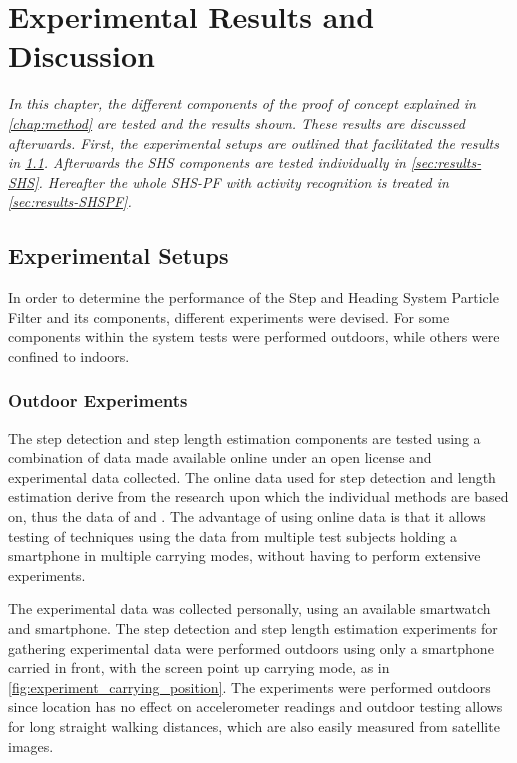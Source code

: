 \chapter{Experimental Results and Discussion}

\textit{In this chapter, the  different components of the proof of concept explained in \cref{chap:method} are tested and the results shown. These results are discussed afterwards. First, the  experimental setups are outlined that facilitated the results in \cref{sec:results-experimental setup}. Afterwards the \ac{SHS} components are tested individually in \cref{sec:results-SHS}. Hereafter the whole SHS-PF with activity recognition is treated in \cref{sec:results-SHSPF}.}

\section{Experimental Setups}
\label{sec:results-experimental setup}
In order to determine the performance of the Step and Heading System Particle Filter and its components, different experiments were devised. For some components within the system tests were performed outdoors, while others were confined to indoors. \par 

\subsection{Outdoor Experiments}
The step detection and step length estimation components are tested using a combination of data made available online under an open license and experimental data collected. The online data used for step detection and length estimation derive from the research upon which the individual methods are based on, thus the data of \citet{Salvi2018} and \citet{Vezocnik2019}. The advantage of using online data is that it allows testing of techniques using the data from multiple test subjects holding a smartphone in multiple carrying modes, without having to perform extensive experiments.  \par 

The experimental data was collected personally, using an available smartwatch and smartphone. The step detection and step length estimation experiments for gathering experimental data  were performed outdoors using only a smartphone carried in front, with the screen point up carrying mode, as in \cref{fig:experiment_carrying_position}. The experiments were performed outdoors since location has no effect on accelerometer readings and outdoor testing allows for long straight walking distances, which are also easily measured from satellite images.\par 

